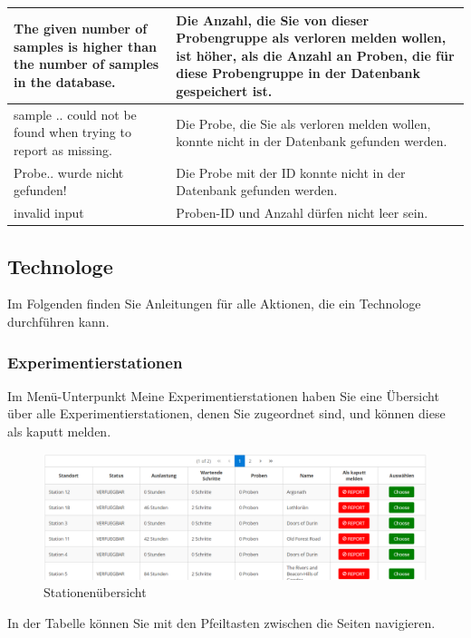\documentclass[enabledeprecatedfontcommands,fontsize=12pt,paper=a4,twoside]{scrartcl}
\begin{document}
\begin{longtable}[c]{|p{5cm}|p{10cm}|}
The given number of samples is higher than the number of samples in the database. &  Die Anzahl, die Sie von dieser Probengruppe als verloren melden wollen, ist höher, als die Anzahl an Proben, die für diese Probengruppe in der Datenbank gespeichert ist. \\ \hline
sample .. could not be found when trying to report as missing. & Die Probe, die Sie als verloren melden wollen, konnte nicht in der Datenbank gefunden werden. \\ \hline
Probe.. wurde nicht gefunden! & Die Probe mit der ID konnte nicht in der Datenbank gefunden werden. \\ \hline
invalid input&Proben-ID und Anzahl dürfen nicht leer sein.  \\ \hline
\end{longtable}
\subsection{Technologe}

Im Folgenden finden Sie Anleitungen für alle Aktionen, die ein Technologe durchführen kann. \\

\subsubsection{Experimentierstationen}
Im Menü-Unterpunkt Meine Experimentierstationen haben Sie eine Übersicht über alle Experimentierstationen, denen Sie zugeordnet sind, und können diese als kaputt melden. \\


\begin{figure}[h!]
\begin{center}
 \includegraphics[width=\textwidth]{screenshots/t/stationen.png}
  \caption{Stationenübersicht}
  \label{fig:boat1}
\end{center}
\end{figure}



In der Tabelle können Sie mit den Pfeiltasten zwischen die Seiten navigieren. \\
\end{document}
